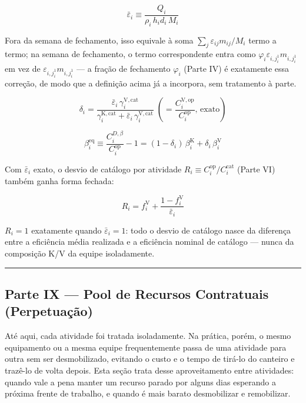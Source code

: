 \documentclass[
  10pt,
]{article}
\begin{document}
\[\bar\varepsilon_i \equiv \frac{Q_i}{\rho_i\,h_id_i\,M_i}\]

Fora da semana de fechamento, isso equivale à soma
\(\sum_j\varepsilon_{ij}m_{ij}/M_i\) termo a termo; na semana de
fechamento, o termo correspondente entra como
\(\varphi_i\varepsilon_{i,j_i^1}m_{i,j_i^1}\) em vez de
\(\varepsilon_{i,j_i^1}m_{i,j_i^1}\) --- a fração de fechamento
\(\varphi_i\) (Parte IV) é exatamente essa correção, de modo que a
definição acima já a incorpora, sem tratamento à parte.

\[\delta_i = \frac{\bar\varepsilon_i\,\gamma_i^{\mathrm{V,cat}}}{\gamma_i^{\mathrm{K,cat}}+\bar\varepsilon_i\,\gamma_i^{\mathrm{V,cat}}} \;\left(=\frac{C_i^{\mathrm{V,op}}}{C_i^{\mathrm{op}}}\text{, exato}\right)\]

\[\boxed{\beta_i^{\mathrm{eq}} \equiv \frac{C_i^{D,\beta}}{C_i^{\mathrm{op}}}-1 = (1-\delta_i)\,\beta_i^{\mathrm K}+\delta_i\,\beta_i^{\mathrm V}}\]

Com \(\bar\varepsilon_i\) exato, o desvio de catálogo por atividade
\(R_i\equiv C_i^{\mathrm{op}}/C_i^{\mathrm{cat}}\) (Parte VI) também
ganha forma fechada:

\[\boxed{R_i = f_i^{\mathrm V} + \frac{1-f_i^{\mathrm V}}{\bar\varepsilon_i}}\]

\(R_i=1\) exatamente quando \(\bar\varepsilon_i=1\): todo o desvio de
catálogo nasce da diferença entre a eficiência média realizada e a
eficiência nominal de catálogo --- nunca da composição K/V da equipe
isoladamente.

\begin{center}\rule{0.5\linewidth}{0.5pt}\end{center}

\hypertarget{parte-ix-pool-de-recursos-contratuais-perpetuauxe7uxe3o}{%
\subsection{Parte IX --- Pool de Recursos Contratuais
(Perpetuação)}\label{parte-ix-pool-de-recursos-contratuais-perpetuauxe7uxe3o}}

Até aqui, cada atividade foi tratada isoladamente. Na prática, porém, o
mesmo equipamento ou a mesma equipe frequentemente passa de uma
atividade para outra sem ser desmobilizado, evitando o custo e o tempo
de tirá-lo do canteiro e trazê-lo de volta depois. Esta seção trata
desse aproveitamento entre atividades: quando vale a pena manter um
recurso parado por alguns dias esperando a próxima frente de trabalho, e
quando é mais barato desmobilizar e remobilizar.
\end{document}

